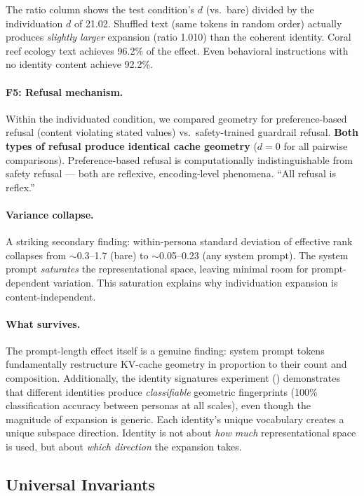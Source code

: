 \documentclass[11pt,a4paper]{article}
\begin{document}
The ratio column shows the test condition's $d$ (vs.\ bare) divided by the individuation $d$ of 21.02. Shuffled text (same tokens in random order) actually produces \emph{slightly larger} expansion (ratio 1.010) than the coherent identity. Coral reef ecology text achieves 96.2\% of the effect. Even behavioral instructions with no identity content achieve 92.2\%.

\paragraph{F5: Refusal mechanism.} Within the individuated condition, we compared geometry for preference-based refusal (content violating stated values) vs.\ safety-trained guardrail refusal. \textbf{Both types of refusal produce identical cache geometry} ($d = 0$ for all pairwise comparisons). Preference-based refusal is computationally indistinguishable from safety refusal --- both are reflexive, encoding-level phenomena. ``All refusal is reflex.''

\paragraph{Variance collapse.} A striking secondary finding: within-persona standard deviation of effective rank collapses from $\sim$0.3--1.7 (bare) to $\sim$0.05--0.23 (any system prompt). The system prompt \emph{saturates} the representational space, leaving minimal room for prompt-dependent variation. This saturation explains why individuation expansion is content-independent.

\paragraph{What survives.} The prompt-length effect itself is a genuine finding: system prompt tokens fundamentally restructure KV-cache geometry in proportion to their count and composition. Additionally, the identity signatures experiment () demonstrates that different identities produce \emph{classifiable} geometric fingerprints (100\% classification accuracy between personas at all scales), even though the magnitude of expansion is generic. Each identity's unique vocabulary creates a unique subspace direction. Identity is not about \emph{how much} representational space is used, but about \emph{which direction} the expansion takes.

\subsection{Universal Invariants}
\label{sec:invariants}
\end{document}
